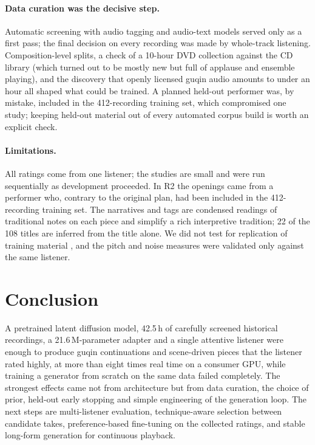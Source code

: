 \paragraph{Data curation was the decisive step.} Automatic screening with audio tagging and audio-text models served
only as a first pass; the final decision on every recording was made by whole-track listening. Composition-level
splits, a check of a 10-hour DVD collection against the CD library (which turned out to be
mostly new but full of applause and ensemble playing), and the discovery that openly licensed guqin audio amounts to
under an hour all shaped what could be trained. A planned held-out performer was, by mistake, included in the
412-recording training set, which compromised one study; keeping held-out material out of every automated corpus
build is worth an explicit check.

\paragraph{Limitations.}\label{sec:limits} All ratings come from one listener; the studies are small and were
run sequentially as development proceeded. In R2 the openings came from a performer who, contrary to the original
plan, had been included in the 412-recording training set. The narratives and tags are condensed readings of
traditional notes on each piece and simplify a rich interpretive tradition; 22 of the 108 titles are inferred from
the title alone. We did not test for replication of training material \citep{batlleroca2024replication}, and the
pitch and noise measures were validated only against the same listener.

\section{Conclusion}\label{sec:conclusion}

A pretrained latent diffusion model, 42.5\,h of carefully screened historical recordings, a 21.6\,M-parameter adapter
and a single attentive listener were enough to produce guqin continuations and scene-driven pieces that the listener
rated highly, at more than eight times real time on a consumer GPU, while training a generator from scratch on the
same data failed completely. The strongest effects came not from architecture but from data curation, the choice of
prior, held-out early stopping and simple engineering of the generation loop. The next steps are multi-listener
evaluation, technique-aware selection between candidate takes, preference-based fine-tuning on the collected ratings,
and stable long-form generation for continuous playback.

